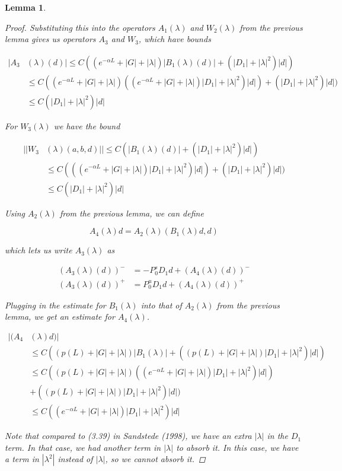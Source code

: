 \documentclass[12pt]{article}
\newtheorem{lemma}{Lemma}
\begin{document}
\begin{lemma}
\begin{proof}
Substituting this into the operators $A_1(\lambda)$ and $W_2(\lambda)$ from the previous lemma gives us operators $A_3$ and $W_3$, which have bounds

\begin{align*}
|A_3&(\lambda)(d)| \leq C ((e^{-\alpha L} + |G| + |\lambda|)|B_1(\lambda)(d)| + (|D_1| + |\lambda|^2)|d| )\\
&\leq C ((e^{-\alpha L} + |G| + |\lambda|)((e^{-\alpha L} + |G| + |\lambda|)|D_1| + |\lambda|^2)|d|) + (|D_1| + |\lambda|^2 )|d| ) \\
&\leq C (|D_1| + |\lambda|^2)|d|
\end{align*}

For $W_3(\lambda)$ we have the bound 

\begin{align*}
||W_3&(\lambda)(a,b,d)|| \leq C(|B_1(\lambda)(d)|  + (|D_1| + |\lambda|^2)|d|)  \\
&\leq C (((e^{-\alpha L} + |G| + |\lambda|)|D_1| + |\lambda|^2)|d|)  + (|D_1| + |\lambda|^2)|d|) \\
&\leq C (|D_1| + |\lambda|^2)|d|
\end{align*} 

Using $A_2(\lambda)$ from the previous lemma, we can define

\[
A_4(\lambda)d = A_2(\lambda)(B_1(\lambda)d,d)
\]

which lets us write $A_3(\lambda)$ as 

\begin{align*}
(A_3(\lambda)(d))^- &= -P_0^s D_1 d + (A_4(\lambda)(d))^-\\
(A_3(\lambda)(d))^+ &= P_0^u D_1 d + (A_4(\lambda)(d))^+
\end{align*}

Plugging in the estimate for $B_1(\lambda)$ into that of $A_2(\lambda)$ from the previous lemma, we get an estimate for $A_4(\lambda)$.

\begin{align*}
|(A_4&(\lambda)d)| \\
&\leq C( (p(L) + |G| + |\lambda|)|B_1(\lambda)| + ((p(L) + |G| + |\lambda|)|D_1| + |\lambda|^2)|d| ) \\
&\leq C( (p(L) + |G| + |\lambda|)((e^{-\alpha L} + |G| + |\lambda|)|D_1| + |\lambda|^2)|d|) \\
&+ ((p(L) + |G| + |\lambda|)|D_1| + |\lambda|^2)|d| ) \\
&\leq C((e^{-\alpha L} + |G| + |\lambda|)|D_1| + |\lambda|^2)|d|
\end{align*}

Note that compared to (3.39) in Sandstede (1998), we have an extra $|\lambda|$ in the $D_1$ term. In that case, we had another term in $|\lambda|$ to absorb it. In this case, we have a term in $|\lambda^2|$ instead of $|\lambda|$, so we cannot absorb it. 

\end{proof}
\end{lemma}
\end{document}
